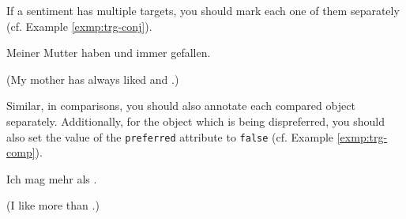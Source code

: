 If a sentiment has multiple targets, you should mark each one of them
separately (cf. Example \ref{exmp:trg-conj}).
\begin{example}
  Meiner Mutter haben  und  immer gefallen.

  (My mother has always liked  and
  .)\label{exmp:trg-conj}
\end{example}

Similar, in comparisons, you should also annotate each compared object
separately.  Additionally, for the object which is being dispreferred,
you should also set the value of the \texttt{preferred} attribute to
\texttt{false} (cf. Example \ref{exmp:trg-comp}).
\begin{example}
  Ich mag  mehr als
  .

  (I like  more than
  .)\label{exmp:trg-comp}
\end{example}

